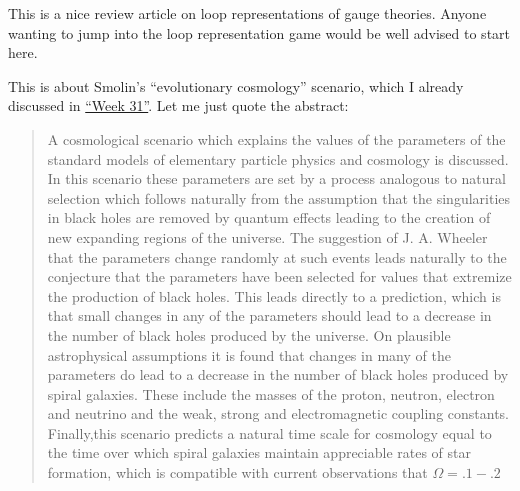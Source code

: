 \documentclass[12pt]{article}
\def\tightlist{}
\renewcommand{\texttt}[1]{%
  \begingroup
  \ttfamily
  \begingroup\lccode`~=`/\lowercase{\endgroup\def~}{/\discretionary{}{}{}}%
  \begingroup\lccode`~=`[\lowercase{\endgroup\def~}{[\discretionary{}{}{}}%
  \begingroup\lccode`~=`.\lowercase{\endgroup\def~}{.\discretionary{}{}{}}%
  \catcode`/=\active\catcode`[=\active\catcode`.=\active
  \scantokens{#1\noexpand}%
  \endgroup
}
\begin{document}
\noindent
This is a nice review article on loop representations of gauge theories.
Anyone wanting to jump into the loop representation game would be well
advised to start here.

\noindent
This is about Smolin's ``evolutionary cosmology'' scenario, which I
already discussed in \protect\hyperlink{week31}{``Week 31''}. Let me
just quote the abstract:

\begin{quote}
A cosmological scenario which explains the values of the parameters of
the standard models of elementary particle physics and cosmology is
discussed. In this scenario these parameters are set by a process
analogous to natural selection which follows naturally from the
assumption that the singularities in black holes are removed by quantum
effects leading to the creation of new expanding regions of the
universe. The suggestion of J. A. Wheeler that the parameters change
randomly at such events leads naturally to the conjecture that the
parameters have been selected for values that extremize the production
of black holes. This leads directly to a prediction, which is that small
changes in any of the parameters should lead to a decrease in the number
of black holes produced by the universe. On plausible astrophysical
assumptions it is found that changes in many of the parameters do lead
to a decrease in the number of black holes produced by spiral galaxies.
These include the masses of the proton, neutron, electron and neutrino
and the weak, strong and electromagnetic coupling constants.
Finally,this scenario predicts a natural time scale for cosmology equal
to the time over which spiral galaxies maintain appreciable rates of
star formation, which is compatible with current observations that
\(\Omega = .1-.2\)
\end{quote}
\end{document}
